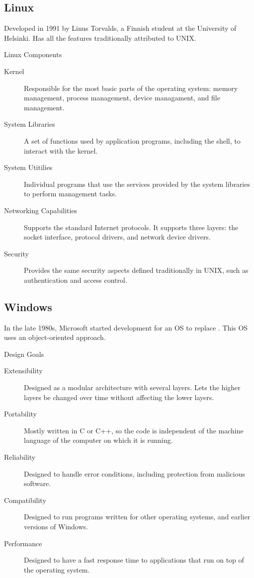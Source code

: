 \documentclass[\main/notes.tex]{subfiles}
\begin{document}
			\subsection{Linux}
				Developed in 1991 by Linus Torvalds, a Finnish student at the University of Helsinki. Has all the features traditionally attributed to UNIX.
				\begin{definition}{Linux Components}
					\begin{description}
						\item[Kernel] Responsible for the most basic parts of the operating system: memory management, process management, device managament, and file management.
						\item[System Libraries] A set of functions used by application programs, including the shell, to interact with the kernel.
						\item[System Utitilies] Individual programs that use the services provided by the system libraries to perform management tasks.
					\end{description}
				\end{definition}
				\begin{description}
					\item[Networking Capabilities] Supports the standard Internet protocols. It supports three layers: the socket interface, protocol drivers, and network device drivers.
					\item[Security] Provides the same security aspects defined traditionally in UNIX, such as authentication and access control.
				\end{description}
			\subsection{Windows}
				In the late 1980s, Microsoft started development for an OS to replace . This OS uses an object-oriented approach.

				\begin{definition}{Design Goals}
					\begin{description}
						\item[Extensibility] Designed as a modular architecture with several layers. Lets the higher layers be changed over time without affecting the lower layers.
						\item[Portability] Mostly written in C or C++, so the code is independent of the machine language of the computer on which it is running.
						\item[Reliability] Designed to handle error conditions, including protection from malicious software.
						\item[Compatibility] Designed to run programs written for other operating systems, and earlier versions of Windows.
						\item[Performance] Designed to have a fast response time to applications that run on top of the operating system.
					\end{description}
				\end{definition}
\end{document}
